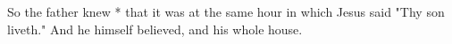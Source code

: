 So the father knew * that it was at the same hour in which Jesus said "Thy son liveth." And he himself believed, and his whole house.